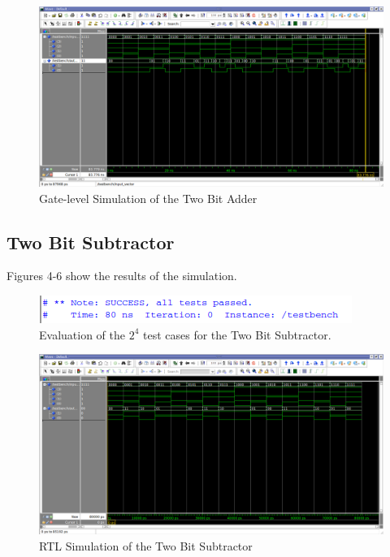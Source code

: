 \documentclass[a4paper, 11pt]{article}
\begin{document}
\begin{figure}[H]
\centering
\includegraphics[scale=0.33]{Adder_Gate}
\caption{Gate-level Simulation of the Two Bit Adder}
\end{figure}

\subsection{Two Bit Subtractor}
Figures 4-6 show the results of the simulation.

\begin{figure}[H]
\centering
\includegraphics[scale=1]{Subtractor_Success}
\caption{Evaluation of the $2^4$ test cases for the Two Bit Subtractor.}
\end{figure}

\begin{figure}[H]
\centering
\includegraphics[scale=0.33]{Subtractor_RTL}
\caption{RTL Simulation of the Two Bit Subtractor}
\end{figure}
\end{document}
